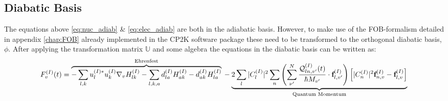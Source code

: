 \subsection{Diabatic Basis}
The equations above \eqref{eq:nuc_adiab} \& \eqref{eq:elec_adiab} are both in the adiabatic basis. However, to make use of the FOB-formalism detailed in appendix \ref{chap:FOB} already implemented in the CP2K software package \cite{CP2K} these need to be transformed to the orthogonal diabatic basis, $\phi$. After applying the transformation matrix $\mathbb{U}$ and some algebra the equations in the diabatic basis can be written as:
\begin{dmath}
{ F_{v}^{(I)}(t)} =
\overbrace{ -\sum_{l,k} u_{l}^{(I) *} u_{k}^{(I)} \nabla_{v} H_{lk}^{(I)} - \sum_{l,k,a} d_{la}^{(I)}H_{ak}^{(I)} - d_{ak}^{(I)}H_{la}^{(I)}}^{\text{Ehrenfest}}
\\
 - \underbrace{2 \sum_{l} |C_{l}^{(I)}|^2 \sum_{n} \left( \sum^{N}_{\nu'} \frac{\mathcal{Q}^{(I)}_{ln,v'}(t)}{\hbar M_{v'}} \cdot \textbf{f}^{(I)}_{l,v'}\right)\left[  |C_{n}^{(I)}|^{2} \textbf{f}^{(I)}_{n,v} - \textbf{f}^{(I)}_{l,v} \right]}_{\text{Quantum Momentum}}
 \label{eq:diab_force}
\end{dmath}

